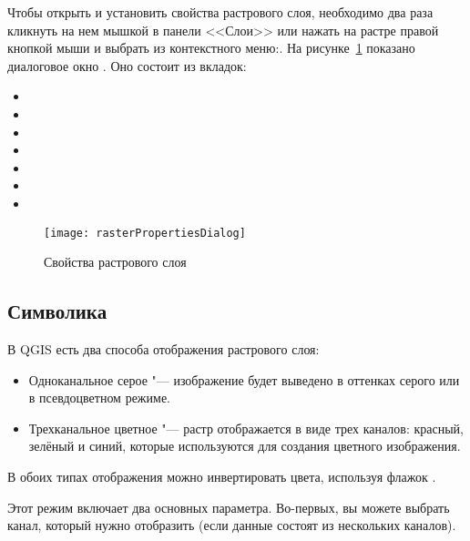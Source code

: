Чтобы открыть и установить свойства растрового слоя, необходимо два раза
кликнуть на нем мышкой в панели <<Слои>> или нажать на растре правой
кнопкой мыши и выбрать  из контекстного
меню:. На рисунке~\ref{fig:raster_properties}
показано диалоговое окно . Оно состоит из
вкладок:

\begin{itemize}[label=--]
 \item {}
 \item {}
 \item {}
 \item {}
 \item {}
 \item {}
 \item {}
\end{itemize}

\begin{figure}[h]
  \centering
   \texttt{[image: rasterPropertiesDialog]}
   \caption{Свойства растрового слоя \wincaption}\label{fig:raster_properties}
\end{figure}

\subsection{Символика}\label{label_symbology}

В QGIS есть два способа отображения растрового слоя:

\begin{itemize}[label=--]
\item Одноканальное серое "--- изображение будет выведено в оттенках серого
или в псевдоцветном режиме.
\item Трехканальное цветное "--- растр отображается в виде трех каналов:
красный, зелёный и синий, которые используются для создания цветного
изображения.
\end{itemize}

В обоих типах отображения можно инвертировать цвета, используя флажок
.


Этот режим включает два основных параметра. Во-первых, вы можете выбрать канал,
который нужно отобразить (если данные состоят из нескольких каналов).

